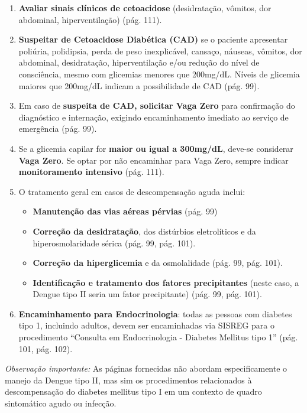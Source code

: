 \documentclass[conference,a4paper]{IEEEtran}
\begin{document}
\begin{enumerate}
  \item \textbf{Avaliar sinais clínicos de cetoacidose}
        (desidratação, vômitos, dor abdominal, hiperventilação)
        (pág. 111).
  \item \textbf{Suspeitar de Cetoacidose Diabética (CAD)} se o
        paciente apresentar poliúria, polidipsia, perda de peso
        inexplicável, cansaço, náuseas, vômitos, dor abdominal,
        desidratação, hiperventilação e/ou redução do nível de
        consciência, mesmo com glicemias menores que 200mg/dL.
        Níveis de glicemia maiores que 200mg/dL indicam a
        possibilidade de CAD (pág. 99).
  \item Em caso de \textbf{suspeita de CAD, solicitar Vaga Zero}
        para confirmação do diagnóstico e internação, exigindo
        encaminhamento imediato ao serviço de emergência
        (pág. 99).
  \item Se a glicemia capilar for \textbf{maior ou igual a
        300mg/dL}, deve-se considerar \textbf{Vaga Zero}. Se
        optar por não encaminhar para Vaga Zero, sempre indicar
        \textbf{monitoramento intensivo} (pág. 111).
  \item O tratamento geral em casos de descompensação aguda
        inclui:
  \begin{itemize}
    \item \textbf{Manutenção das vias aéreas pérvias} (pág. 99)
    \item \textbf{Correção da desidratação}, dos distúrbios
          eletrolíticos e da hiperosmolaridade sérica (pág. 99,
          pág. 101).
    \item \textbf{Correção da hiperglicemia} e da osmolalidade
          (pág. 99, pág. 101).
    \item \textbf{Identificação e tratamento dos fatores
          precipitantes} (neste caso, a Dengue tipo II seria um
          fator precipitante) (pág. 99, pág. 101).
  \end{itemize}
  \item \textbf{Encaminhamento para Endocrinologia}: todas as
        pessoas com diabetes tipo 1, incluindo adultos, devem ser
        encaminhadas via SISREG para o procedimento ``Consulta em
        Endocrinologia - Diabetes Mellitus tipo 1'' (pág. 101,
        pág. 102).
\end{enumerate}

\textit{Observação importante:} As páginas fornecidas não
abordam especificamente o manejo da Dengue tipo II, mas sim os
procedimentos relacionados à descompensação do diabetes mellitus
tipo I em um contexto de quadro sintomático agudo ou infecção.
\end{document}
